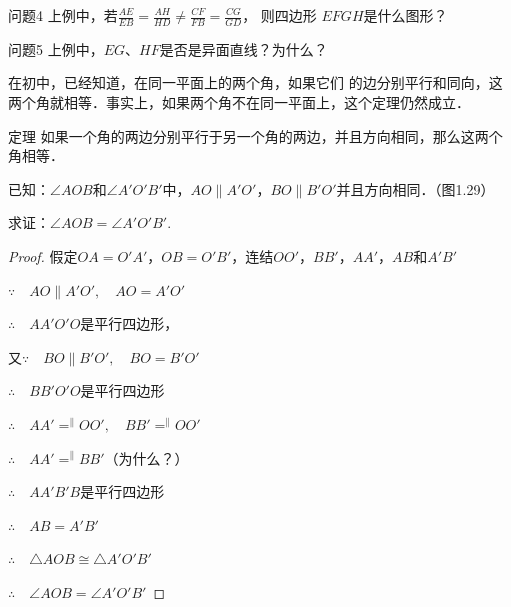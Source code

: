 \begin{blk}{问题4}
  上例中，若$\frac{AE}{EB}=\frac{AH}{HD}\ne \frac{CF}{FB}=\frac{CG}{GD}$，
则四边形
$EFGH$是什么图形？
\end{blk}

\begin{blk}{问题5}
  上例中，$EG$、$HF$是否是异面直线？为什么？
\end{blk}


在初中，已经知道，在同一平面上的两个角，如果它们
的边分别平行和同向，这两个角就相等．事实上，如果两个角不在同一平面上，这个定理仍然成立．

\begin{blk}
  {定理} 如果一个角的两边分别平行于另一个角的两边，并且方向相同，那么这两个角相等．
\end{blk}

已知：$\angle AOB$和$\angle A'O'B'$中，$AO\parallel A'O'$，$BO\parallel B'O'$并且方向相同．（图1.29）

求证：$\angle AOB=\angle A'O'B'$.

\begin{figure}[htp]
  \centering
{}
  \caption{}
\end{figure}

\begin{proof}
  假定$OA=O'A'$，$OB=O'B'$，连结$OO'$，$BB'$，$AA'$，$AB$和$A'B'$

$\because \quad AO\parallel A'O',\quad AO=A'O'$

$\therefore\quad AA'O'O$是平行四边形，

又$\because\quad BO\parallel B'O',\quad BO=B'O'$

$\therefore\quad BB'O'O$是平行四边形

$\therefore\quad AA'\displaystyle\mathop{=}^{\parallel} OO',\quad BB'\displaystyle\mathop{=}^{\parallel}OO'$

$\therefore\quad AA'\displaystyle\mathop{=}^{\parallel}BB'$（为什么？）

$\therefore\quad AA'B'B$是平行四边形

$\therefore\quad AB=A'B'$

$\therefore\quad \triangle AOB\cong\triangle A'O'B'$

$\therefore\quad \angle AOB=\angle A'O'B'$
\end{proof}

